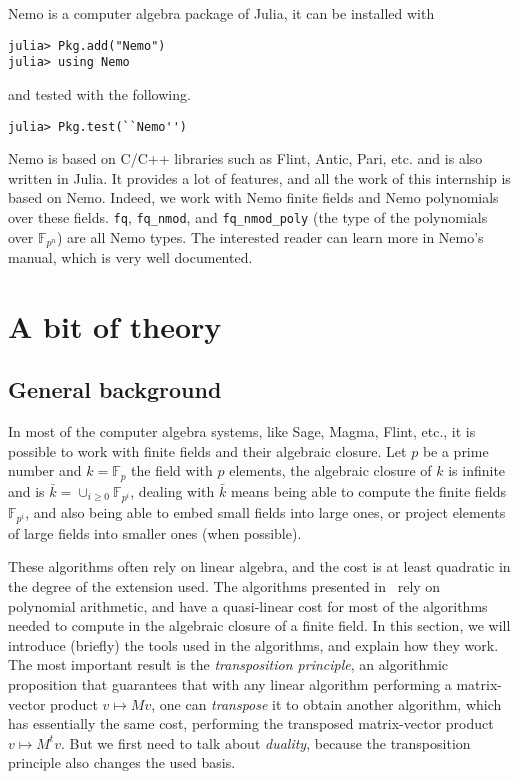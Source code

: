 \documentclass[a4paper,11pt]{article}
\theoremstyle{break}
\theoremstyle{definition}
\theoremstyle{remark}
\begin{document}
Nemo is a computer algebra package of Julia, it can be installed with 
\begin{verbatim}
julia> Pkg.add("Nemo")
julia> using Nemo
\end{verbatim}
and tested with the following.
\begin{verbatim}
julia> Pkg.test(``Nemo'')
\end{verbatim}
Nemo is based on C/C++ libraries such as Flint, Antic, Pari, etc. and is also
written in Julia. It provides a lot of features, and all the work of this
internship is based on Nemo. Indeed, we work with Nemo finite fields and Nemo
polynomials over these fields. \texttt{fq}, \texttt{fq\_nmod}, and
\texttt{fq\_nmod\_poly} (the type of the polynomials over $\mathbb{F}_{p^n}$) 
are
all Nemo types. The interested reader can learn more in Nemo's manual, which is very well
documented.

\section{A bit of theory}
\subsection{General background}
In most of the computer algebra systems, like Sage, Magma, Flint, etc., it is 
possible to work with finite
fields and their algebraic closure. Let $p$ be a prime number and
$k=\mathbb{F}_p$ the field with $p$ elements, the algebraic closure of $k$ is
infinite and is $\bar k = \cup_{i\geq 0} \mathbb{F}_{p^i}$, dealing with $\bar
k$ means being able to compute the finite fields $\mathbb{F}_{p^i}$, and also
being able to embed small fields into large ones, or project elements of large
fields into smaller ones (when possible).

These algorithms often rely on linear algebra, and the cost is at least 
quadratic in the degree of the extension used. The algorithms presented
in~\cite{DeDoSc14} rely on polynomial arithmetic, and have a quasi-linear cost for 
most of the algorithms needed to
compute in the algebraic closure of a finite field. In this section, we will
introduce (briefly) the tools used in the algorithms, and explain how they work.
The most important result is the \emph{transposition principle}, an
algorithmic proposition that guarantees that with any linear algorithm
performing a matrix-vector product $v\mapsto Mv$, one can \emph{transpose} it to
obtain another algorithm, which has essentially the same cost, performing the 
transposed matrix-vector product $v\mapsto
M^tv$. But we first need to talk about \emph{duality}, because the transposition
principle also changes the used basis. 
\end{document}
